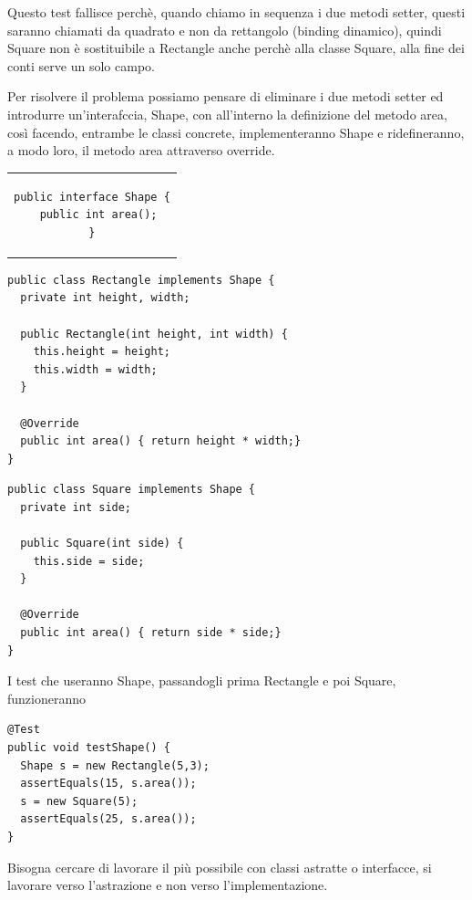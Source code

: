 Questo test fallisce perchè, quando chiamo in sequenza i due metodi setter, questi saranno chiamati da quadrato e non da rettangolo (binding dinamico), quindi Square 
non è sostituibile a Rectangle anche perchè alla classe Square, alla fine dei conti serve un solo campo.
\smallskip

Per risolvere il problema possiamo pensare di eliminare i due metodi setter ed introdurre un'interafccia, Shape, con all'interno la definizione del metodo area, così 
facendo, entrambe le classi concrete, implementeranno Shape e ridefineranno, a modo loro, il metodo area attraverso override.

\begin{center}
\begin{tabular}{c}
\begin{lstlisting}[linewidth=4cm]
public interface Shape {
  public int area();
}
\end{lstlisting}
\end{tabular}
\end{center}

\begin{multicols}{2}
\begin{lstlisting}
public class Rectangle implements Shape {
  private int height, width;
  
  public Rectangle(int height, int width) {
    this.height = height;
    this.width = width;
  }

  @Override
  public int area() { return height * width;}
}
\end{lstlisting}
\columnbreak
\begin{lstlisting}
public class Square implements Shape {
  private int side;
  
  public Square(int side) {
    this.side = side;
  }
  
  @Override
  public int area() { return side * side;}
}
\end{lstlisting}
\end{multicols}

I test che useranno Shape, passandogli prima Rectangle e poi Square, funzioneranno
\begin{lstlisting}[linewidth=6cm]
@Test
public void testShape() {
  Shape s = new Rectangle(5,3);
  assertEquals(15, s.area());
  s = new Square(5);
  assertEquals(25, s.area());
}  
\end{lstlisting}

Bisogna cercare di lavorare il più possibile con classi astratte o interfacce, si lavorare verso l'astrazione e non verso l'implementazione.

